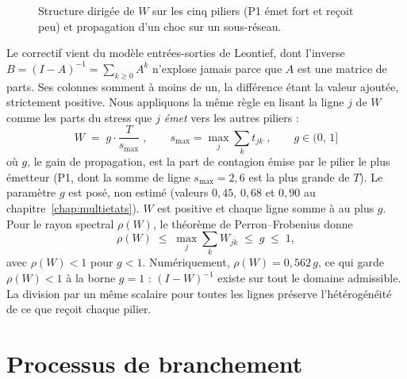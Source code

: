 \begin{figure}[H]\centering
{}
\caption{Structure dirigée de $W$ sur les cinq piliers (P1 émet fort et reçoit peu) et
propagation d'un choc sur un sous-réseau.}
\label{fig:reseau-W}
\end{figure}

Le correctif vient du modèle entrées-sorties de Leontief, dont l'inverse
$B=(I-A)^{-1}=\sum_{k\ge0}A^k$ n'explose jamais parce que $A$ est une matrice de parts. Ses
colonnes somment à moins de un, la différence étant la valeur ajoutée, strictement positive.
Nous appliquons la même règle en lisant la ligne $j$ de $W$ comme les parts du stress que $j$
\emph{émet} vers les autres piliers :
\begin{equation}
\label{eq:norm}
\boxed{\;W \;=\; g \cdot \frac{T}{s_{\max}}\;,
\qquad s_{\max}=\max_j \sum_k t_{jk}\;,\qquad g \in (0,\,1]\;}
\end{equation}
où $g$, le gain de propagation, est la part de contagion émise par le pilier le plus émetteur (P1, dont la somme de ligne $s_{\max}=2{,}6$ est la plus grande de $T$).
Le paramètre $g$ est posé, non estimé (valeurs $0{,}45$, $0{,}68$ et $0{,}90$ au
chapitre~\ref{chap:multietats}). $W$ est positive et chaque ligne somme à
au plus $g$. Pour le rayon spectral $\rho(W)$, le théorème de Perron--Frobenius donne
\begin{equation}
\rho(W)\;\le\;\max_j\sum_k W_{jk}\;\le\;g\;\le\;1,
\end{equation}
avec $\rho(W)<1$ pour $g<1$. Numériquement, $\rho(W)=0{,}562\,g$, ce qui garde $\rho(W)<1$ à la borne
$g=1$ : $(I-W)^{-1}$ existe sur tout le domaine admissible. La
division par un même scalaire pour toutes les lignes préserve l'hétérogénéité de ce que reçoit
chaque pilier.


\section{Processus de branchement}
\label{sec:branch}


